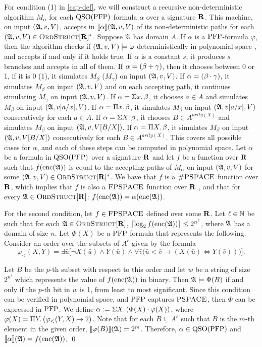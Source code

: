 For condition (1) in \ref{cap-def}, we will construct a recursive non-deterministic algorithm $M_{\alpha}$ for each ${\rm QSO}({\rm PFP})$ formula $\alpha$ over a signature $\mathbf{R}$. This machine, on input $(\mathfrak{A},v,V)$, accepts in ${\llbracket{}{\alpha}\rrbracket}(\mathfrak{A},v,V)$ of its non-deterministic paths for each $(\mathfrak{A},v,V) \in \text{\sc OrdStruct}[\mathbf{R}]^*$. Suppose $\mathfrak{A}$ has domain $A$. If $\alpha$ is a ${\rm PFP}$-formula $\varphi$, then the algorithm checks if $(\mathfrak{A},v,V)\models\varphi$ deterministically in polynomial space \cite{AbiteboulV89}, and accepts if and only if it holds true. If $\alpha$ is a constant $s$, it produces $s$ branches and accepts in all of them. If $\alpha = (\beta + \gamma)$, then it chooses between 0 or 1, if it is 0 (1), it simulates $M_{\beta}$ ($M_{\gamma}$) on input $(\mathfrak{A},v,V)$. If $\alpha = (\beta \cdot \gamma)$, it simulates $M_{\beta}$ on input $(\mathfrak{A},v,V)$ and on each accepting path, it continues simulating $M_{\gamma}$ on input $(\mathfrak{A},v,V)$. If $\alpha = \Sigma{x}.\,\beta$, it chooses $a\in A$ and simulates $M_{\beta}$ on input $(\mathfrak{A},v[a/x],V)$. If $\alpha = \Pi{x}.\,\beta$, it simulates $M_{\beta}$ on input $(\mathfrak{A},v[a/x],V)$ consecutively for each $a\in A$. If $\alpha = \Sigma{X}.\,\beta$, it chooses $B\in A^{arity(X)}$ and simulates $M_{\beta}$ on input $(\mathfrak{A},v,V[B/X])$. If $\alpha = \Pi{X}.\,\beta$, it simulates $M_{\beta}$ on input $(\mathfrak{A},v,V[B/X])$ consecutively for each $B\in A^{arity(X)}$. This covers all possible cases for $\alpha$, and each of these steps can be computed in polynomial space. Let $\alpha$ be a formula in ${\rm QSO}({\rm PFP})$ over a signature $\mathbf{R}$ and let $f$ be a function over $\mathbf{R}$ such that $f({\rm enc}(\mathfrak{A}))$ is equal to the accepting paths of $M_{\alpha}$ on input $(\mathfrak{A},v,V)$ for some $(\mathfrak{A},v,V) \in \text{\sc OrdStruct}[\mathbf{R}]^*$. We have that $f$ is a $\text{\sc \#PSPACE}$ function over $\mathbf{R}$, which implies that $f$ is also a $\text{\sc FPSPACE}$ function over $\mathbf{R}$ \cite{Ladner89}, and that for every $\mathfrak{A}\in\text{\sc OrdStruct}[\mathbf{R}]$: $f({\rm enc}(\mathfrak{A})) = \alpha({\rm enc}(\mathfrak{A}))$. 

For the second condition, let $f\in \text{\sc FPSPACE}$ defined over some $\mathbf{R}$. Let $\ell\in\mathbb{N}$ be such that for each $\mathfrak{A}\in\text{\sc OrdStruct}[\mathbf{R}]$, $\lceil\log_2 f({\rm enc}(\mathfrak{A})) \rceil \leq 2^{n^\ell}$, where $\mathfrak{A}$ has a domain of size $n$. Let $\Phi(X)$ be a ${\rm PFP}$ formula that represents the following. Consider an order over the subsets of $A^{\ell}$ given by the formula $$\varphi_{<}(X,Y) = \exists\bar{u}\big[\neg X(\bar{u})\wedge Y(\bar{u})\wedge \forall\bar{v}\big(
\bar{u}<\bar{v}\to(X(\bar{u})\iff Y(\bar{v}))\big)\big].$$ 

Let $B$ be the $p$-th subset with respect to this order and let $w$ be a string of size $2^{n^{\ell}}$ which represents the value of $f({\rm enc}(\mathfrak{A}))$ in binary. Then $\mathfrak{A}\models\Phi(B)$ if and only if the $p$-th bit in $w$ is 1, from least to most significant. Since this condition can be verified in polynomial space, and ${\rm PFP}$ captures $\text{\sc PSPACE}$, then $\Phi$ can be expressed in ${\rm PFP}$. We define
$\alpha := \Sigma{X}.\,(\Phi(X)\cdot\varphi(X))$, where $\varphi(X) = \Pi{Y}.\,(\varphi_{<}(Y,X)\mapsto 2)$. Note that for each $B\subseteq A^{\ell}$ such that $B$ is the $m$-th element in the given order, ${\llbracket{}{\varphi(B)}\rrbracket}(\mathfrak{A}) = 2^m$. Therefore, $\alpha\in{\rm QSO}({\rm PFP})$ and ${\llbracket{}{\alpha}\rrbracket}(\mathfrak{A}) = f({\rm enc}(\mathfrak{A}))$. \qed

